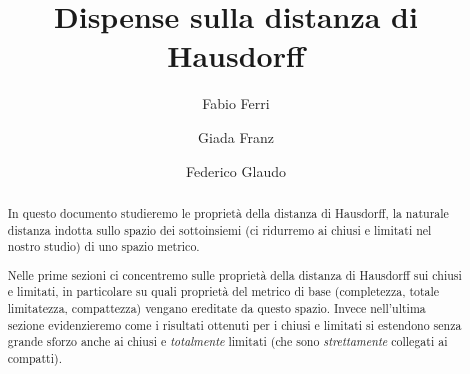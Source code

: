 \documentclass[a4paper,12pt]{article}
\title{Dispense sulla distanza di Hausdorff}
\author{Fabio Ferri \and Giada Franz \and Federico Glaudo}
\begin{document}
\maketitle


\begin{abstract}
	In questo documento studieremo le proprietà della distanza di Hausdorff, la naturale distanza indotta sullo spazio dei sottoinsiemi (ci ridurremo ai chiusi e limitati nel nostro studio) di uno spazio metrico. 
	
	Nelle prime sezioni ci concentremo sulle proprietà della distanza di Hausdorff sui chiusi e limitati, in particolare su quali proprietà del metrico di base (completezza, totale limitatezza, compattezza) vengano ereditate da questo spazio. 
	Invece nell'ultima sezione evidenzieremo come i risultati ottenuti per i chiusi e limitati si estendono senza grande sforzo anche ai chiusi e \emph{totalmente} limitati (che sono \emph{strettamente} collegati ai compatti).
\end{abstract}
\clearpage






\end{document}
